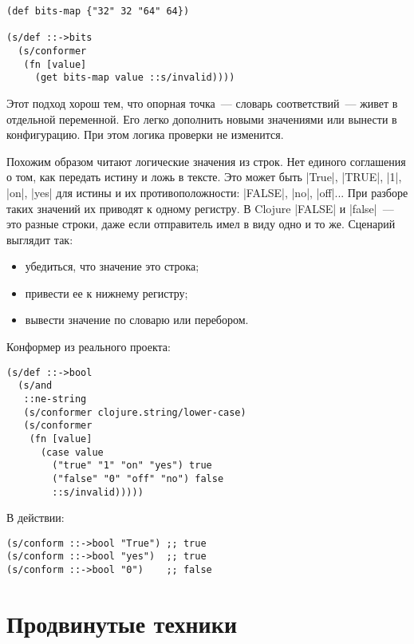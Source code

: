 \begin{verbatim}
(def bits-map {"32" 32 "64" 64})

(s/def ::->bits
  (s/conformer
   (fn [value]
     (get bits-map value ::s/invalid))))
\end{verbatim}

Этот подход хорош тем, что опорная точка~--- словарь соответствий~--- живет в
отдельной переменной. Его легко дополнить новыми значениями или вынести в
конфигурацию. При этом логика проверки не изменится.

Похожим образом читают логические значения из строк. Нет единого соглашения о
том, как передать истину и ложь в тексте. Это может быть \spverb|True|,
\spverb|TRUE|, \spverb|1|, \spverb|on|, \spverb|yes| для истины и их
противоположности: \spverb|FALSE|, \spverb|no|, \spverb|off|... При разборе
таких значений их приводят к одному регистру. В Clojure \spverb|FALSE| и
\spverb|false|~--- это разные строки, даже если отправитель имел в виду одно и
то же. Сценарий выглядит так:

\begin{itemize}

\item
  убедиться, что значение это строка;

\item
  привести ее к нижнему регистру;

\item
  вывести значение по словарю или перебором.

\end{itemize}

\noindent
Конформер из реального проекта:

\begin{verbatim}
(s/def ::->bool
  (s/and
   ::ne-string
   (s/conformer clojure.string/lower-case)
   (s/conformer
    (fn [value]
      (case value
        ("true" "1" "on" "yes") true
        ("false" "0" "off" "no") false
        ::s/invalid)))))

\end{verbatim}

\noindent
В действии:

\begin{verbatim}
(s/conform ::->bool "True") ;; true
(s/conform ::->bool "yes")  ;; true
(s/conform ::->bool "0")    ;; false
\end{verbatim}

\section{Продвинутые техники}

